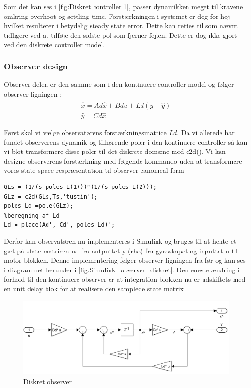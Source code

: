 Som det kan ses i \autoref{fig:Diskret controller 1}, passer dynamikken meget til kravene omkring overhoot og settling time. Forstærkningen i systemet er dog for høj hvilket resulterer i betydelig steady state error. Dette kan rettes til som nævnt tidligere ved at tilføje den sidste pol som fjerner fejlen. Dette er dog ikke gjort ved den diskrete controller model. 

\subsubsection{Observer design}
Observer delen er den samme som i den kontinuere controller model og følger observer ligningen \cite{nise2011control}:
\begin{gather}
\dot{\hat{x}}=Ad\hat{x}+Bdu+Ld(y-\hat{y}) \\
\hat{y}=Cd\hat{x}
\end{gather}

Først skal vi vælge observatørens forstærkningsmatrice $ Ld $. Da vi allerede har fundet observerens dynamik og tilhørende poler i den kontinuere controller så kan vi blot transformere disse poler til det diskrete domæne med c2d(). Vi kan designe observerens forstærkning med følgende kommando uden at transformere vores state space respræsentation til observer canonical form
\begin{lstlisting}[frame=single]
%valg af Ld poler 
GLs = (1/(s-poles_L(1)))*(1/(s-poles_L(2)));
GLz = c2d(GLs,Ts,'tustin');
poles_Ld =pole(GLz);
%beregning af Ld
Ld = place(Ad', Cd', poles_Ld)';  
\end{lstlisting}

Derfor kan observatøren nu implementeres i Simulink og bruges til at hente et gæt på state matricen ud fra outputtet y (rho) fra gyroskopet og inputtet u til motor blokken. Denne implementering følger observer ligningen fra før og kan ses i diagrammet herunder i \autoref{fig:Simulink_observer_diskret}.
Den eneste ændring i forhold til den kontinuere observer er at integration blokken nu er udskiftets med en unit delay blok for at realisere den samplede state matrix   

\begin{figure}[H]
	\centering
	\includegraphics[width = 1\textwidth]{figur/Simulink_observer_diskret}
	\caption{Diskret observer}
	\label{fig:Simulink_observer_diskret}
\end{figure}


